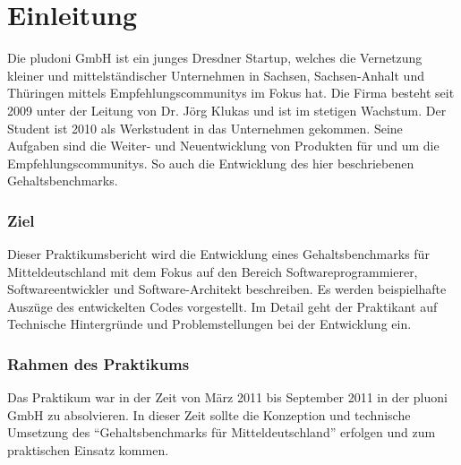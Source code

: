 \part{Einleitung}
Die pludoni GmbH ist ein junges Dresdner Startup, welches die Vernetzung kleiner und mittelständischer Unternehmen in Sachsen, Sachsen-Anhalt und Thüringen 
mittels Empfehlungscommunitys im Fokus hat. Die Firma besteht seit 2009 unter der Leitung von Dr. Jörg Klukas und ist im stetigen Wachstum. 
Der Student ist 2010 als Werkstudent in das Unternehmen gekommen. Seine Aufgaben sind die Weiter- und Neuentwicklung von Produkten für und um die Empfehlungscommunitys. 
So auch die Entwicklung des hier beschriebenen Gehaltsbenchmarks. 
\section{Ziel}
Dieser Praktikumsbericht wird die Entwicklung eines Gehaltsbenchmarks für Mitteldeutschland mit dem Fokus auf den Bereich Softwareprogrammierer, Softwareentwickler und Software-Architekt beschreiben. 
Es werden beispielhafte Auszüge des entwickelten Codes vorgestellt. Im Detail geht der Praktikant auf Technische Hintergründe und Problemstellungen bei der Entwicklung ein.
\section{Rahmen des Praktikums}
Das Praktikum war in der Zeit von März 2011 bis September 2011 in der pluoni GmbH zu absolvieren. 
In dieser Zeit sollte die Konzeption und technische Umsetzung des ``Gehaltsbenchmarks für Mitteldeutschland'' erfolgen und zum praktischen Einsatz kommen.
